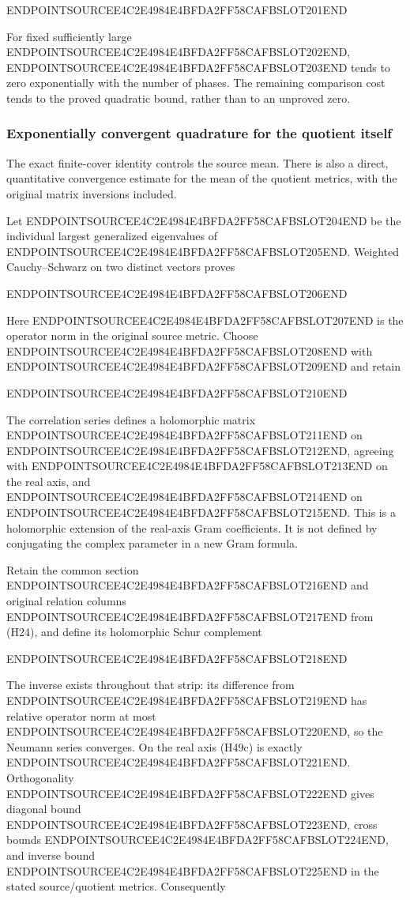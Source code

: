 ENDPOINTSOURCEE4C2E4984E4BFDA2FF58CAFBSLOT201END

For fixed sufficiently large ENDPOINTSOURCEE4C2E4984E4BFDA2FF58CAFBSLOT202END, ENDPOINTSOURCEE4C2E4984E4BFDA2FF58CAFBSLOT203END tends to zero exponentially with the number of phases. The remaining comparison cost tends to the proved quadratic bound, rather than to an unproved zero.

\subsubsection{Exponentially convergent quadrature for the quotient itself}\label{endpoint-holonomy_original--exponentially-convergent-quadrature-for-the-quotient-itself}

The exact finite-cover identity controls the source mean. There is also a direct, quantitative convergence estimate for the mean of the quotient metrics, with the original matrix inversions included.

Let ENDPOINTSOURCEE4C2E4984E4BFDA2FF58CAFBSLOT204END be the individual largest generalized eigenvalues of ENDPOINTSOURCEE4C2E4984E4BFDA2FF58CAFBSLOT205END. Weighted Cauchy--Schwarz on two distinct vectors proves

ENDPOINTSOURCEE4C2E4984E4BFDA2FF58CAFBSLOT206END

Here ENDPOINTSOURCEE4C2E4984E4BFDA2FF58CAFBSLOT207END is the operator norm in the original source metric. Choose ENDPOINTSOURCEE4C2E4984E4BFDA2FF58CAFBSLOT208END with ENDPOINTSOURCEE4C2E4984E4BFDA2FF58CAFBSLOT209END and retain

ENDPOINTSOURCEE4C2E4984E4BFDA2FF58CAFBSLOT210END

The correlation series defines a holomorphic matrix ENDPOINTSOURCEE4C2E4984E4BFDA2FF58CAFBSLOT211END on ENDPOINTSOURCEE4C2E4984E4BFDA2FF58CAFBSLOT212END, agreeing with ENDPOINTSOURCEE4C2E4984E4BFDA2FF58CAFBSLOT213END on the real axis, and ENDPOINTSOURCEE4C2E4984E4BFDA2FF58CAFBSLOT214END on ENDPOINTSOURCEE4C2E4984E4BFDA2FF58CAFBSLOT215END. This is a holomorphic extension of the real-axis Gram coefficients. It is not defined by conjugating the complex parameter in a new Gram formula.

Retain the common section ENDPOINTSOURCEE4C2E4984E4BFDA2FF58CAFBSLOT216END and original relation columns ENDPOINTSOURCEE4C2E4984E4BFDA2FF58CAFBSLOT217END from (H24), and define its holomorphic Schur complement

ENDPOINTSOURCEE4C2E4984E4BFDA2FF58CAFBSLOT218END

The inverse exists throughout that strip: its difference from ENDPOINTSOURCEE4C2E4984E4BFDA2FF58CAFBSLOT219END has relative operator norm at most ENDPOINTSOURCEE4C2E4984E4BFDA2FF58CAFBSLOT220END, so the Neumann series converges. On the real axis (H49c) is exactly ENDPOINTSOURCEE4C2E4984E4BFDA2FF58CAFBSLOT221END. Orthogonality ENDPOINTSOURCEE4C2E4984E4BFDA2FF58CAFBSLOT222END gives diagonal bound ENDPOINTSOURCEE4C2E4984E4BFDA2FF58CAFBSLOT223END, cross bounds ENDPOINTSOURCEE4C2E4984E4BFDA2FF58CAFBSLOT224END, and inverse bound ENDPOINTSOURCEE4C2E4984E4BFDA2FF58CAFBSLOT225END in the stated source/quotient metrics. Consequently

